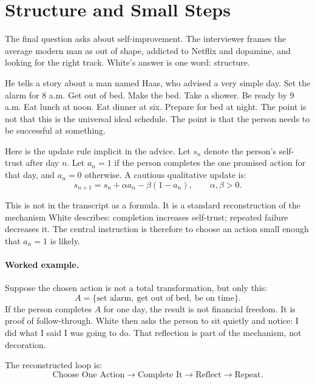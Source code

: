 \section{Structure and Small Steps}

The final question asks about self-improvement. The interviewer frames the average modern man as out of shape, addicted to Netflix and dopamine, and looking for the right track. White's answer is one word: structure.

He tells a story about a man named Haas, who advised a very simple day. Set the alarm for 8 a.m. Get out of bed. Make the bed. Take a shower. Be ready by 9 a.m. Eat lunch at noon. Eat dinner at six. Prepare for bed at night. The point is not that this is the universal ideal schedule. The point is that the person needs to be successful at something.

Here is the update rule implicit in the advice. Let \(s_n\) denote the person's self-trust after day \(n\). Let \(a_n=1\) if the person completes the one promised action for that day, and \(a_n=0\) otherwise. A cautious qualitative update is:
\begin{equation}
s_{n+1}=s_n+\alpha a_n-\beta(1-a_n),
\qquad \alpha,\beta>0.
\end{equation}

This is not in the transcript as a formula. It is a standard reconstruction of the mechanism White describes: completion increases self-trust; repeated failure decreases it. The central instruction is therefore to choose an action small enough that \(a_n=1\) is likely.

\paragraph{Worked example.}
Suppose the chosen action is not a total transformation, but only this:
\begin{equation}
A=\{\text{set alarm},\ \text{get out of bed},\ \text{be on time}\}.
\end{equation}
If the person completes \(A\) for one day, the result is not financial freedom. It is proof of follow-through. White then asks the person to sit quietly and notice: I did what I said I was going to do. That reflection is part of the mechanism, not decoration.

The reconstructed loop is:
\begin{equation}
\text{Choose One Action}
\longrightarrow
\text{Complete It}
\longrightarrow
\text{Reflect}
\longrightarrow
\text{Repeat}.
\end{equation}


